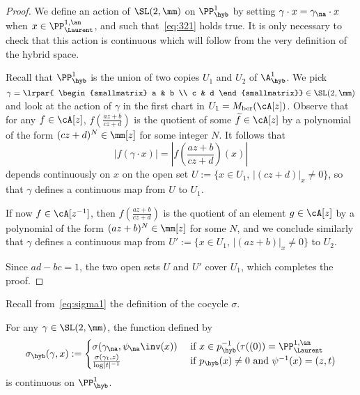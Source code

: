 \begin{proof}
We define an action of $\SL(2,\mm)$ on $\PP^1_{\hyb}$ by setting $\gamma \cdot x = \gamma_{\na} \cdot x$ when $x\in \PP^{1,\an}_{\Laurent}$, and such that~\eqref{eq:321} holds true. It is only necessary to check that this action is continuous which will follow from the very definition of the hybrid space.

Recall that $\PP^1_{\hyb}$ is the union of two copies $U_1$ and $U_2$ of $\A^1_{\hyb}$. We pick $\gamma = \lrpar{
\begin{smallmatrix} a & b \\ c & d
\end{smallmatrix}} \in \SL(2,\mm)$
and look at the action of $\gamma$ in the first chart in $U_1= M_{\mathrm{ber}}(\cA[z])$. Observe that for any $f\in \cA[z]$, $f(\frac{az+b}{cz+d})$ is the quotient of some $\widetilde{f}\in \cA[z]$ by a polynomial of the form $(cz+d)^N\in \mm[z]$ for some integer $N$. It follows that
\[
|f(\gamma \cdot x)| = \left|f\left(\frac{az+b}{cz+d}\right) (x)\right|
\]
depends continuously on $x$ on the open set $U:= \{x\in U_1, \, |(cz+d)|_x\neq 0\}$, so that $\gamma$ defines a continuous map from $U$ to $U_1$.

If now $f\in \cA[z^{-1}]$, then $f(\frac{az+b}{cz+d})$ is the quotient of an element $g\in \cA[z]$ by a polynomial of the form $(az+b)^N\in \mm[z]$ for some $N$, and we conclude similarly that $\gamma$ defines a continuous map from $U':= \{x\in U_1, \, |(az+b)|_x\neq 0\}$ to $U_2$.

Since $ad-bc =1$, the two open sets $U$ and $U'$ cover $U_1$, which completes the proof.
\end{proof}

Recall from~\eqref{eq:sigma1} the definition of the cocycle $\sigma$.

\begin{prop}\label{prop:hybrid sigma}
For any $\gamma\in \SL(2,\mm)$, the function defined by
\[
\sigma_{\hyb}(\gamma,x) :=
\begin{cases}
\sigma(\gamma_\na,\psi_\na\inv(x)) & \text{ if } x \in p_{\hyb}^{-1}(\tau((0)) = \PP^{1,\an}_{\Laurent}
\\
\frac{\sigma(\gamma_t,z)}{\log\mathopen|t\mathclose|^{-1}}& \text{ if } p_{\hyb}(x) \neq 0 \text{ and } \psi^{-1}(x) = (z,t)
\end{cases}
\]
is continuous on $\PP^1_{\hyb}$.
\end{prop}

